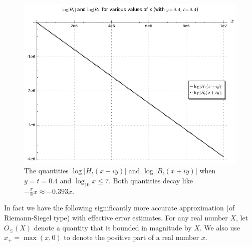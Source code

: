 \begin{figure}[h!]
  \includegraphics[width=0.8\linewidth]{loghtbt.png}
  \caption{The quantities $\log|H_t(x+iy)|$ and $\log|B_t(x+iy)|$ when $y=t=0.4$ and $\log_{10} x \leq 7$.   Both quantities decay like $- \frac{\pi}{8} x \approx -0.393 x$.}
\label{loghtandlogbt}
\end{figure}

In fact we have the following significantly more accurate approximation (of Riemann-Siegel type) with effective error estimates.
For any real number $X$, let $O_{\leq}(X)$ denote a quantity that is bounded in magnitude by $X$. We also use $x_+ = \max(x,0)$ to denote the positive part of a real number $x$.

